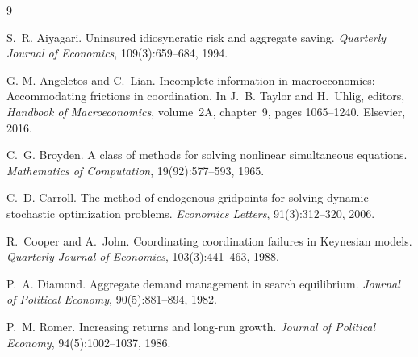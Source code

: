 \documentclass[12pt]{article}
\begin{document}
\begin{thebibliography}{9}

S.~R. Aiyagari.
\newblock Uninsured idiosyncratic risk and aggregate saving.
\newblock \emph{Quarterly Journal of Economics}, 109(3):659--684, 1994.

G.-M. Angeletos and C.~Lian.
\newblock Incomplete information in macroeconomics: Accommodating frictions in coordination.
\newblock In J.~B. Taylor and H.~Uhlig, editors, \emph{Handbook of Macroeconomics}, volume~2A, chapter~9, pages 1065--1240. Elsevier, 2016.

C.~G. Broyden.
\newblock A class of methods for solving nonlinear simultaneous equations.
\newblock \emph{Mathematics of Computation}, 19(92):577--593, 1965.

C.~D. Carroll.
\newblock The method of endogenous gridpoints for solving dynamic stochastic optimization problems.
\newblock \emph{Economics Letters}, 91(3):312--320, 2006.

R.~Cooper and A.~John.
\newblock Coordinating coordination failures in {K}eynesian models.
\newblock \emph{Quarterly Journal of Economics}, 103(3):441--463, 1988.

P.~A. Diamond.
\newblock Aggregate demand management in search equilibrium.
\newblock \emph{Journal of Political Economy}, 90(5):881--894, 1982.

P.~M. Romer.
\newblock Increasing returns and long-run growth.
\newblock \emph{Journal of Political Economy}, 94(5):1002--1037, 1986.

\end{thebibliography}
\end{document}
